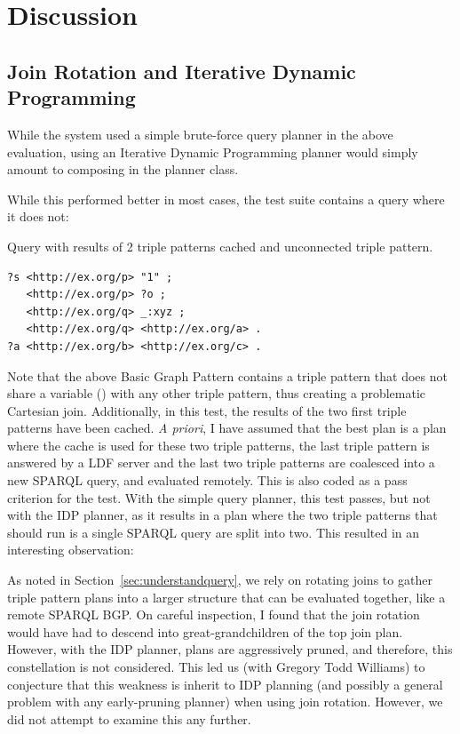 \section{Discussion}

\subsection{Join Rotation and Iterative Dynamic
  Programming}

While the system used a simple brute-force query planner in the above
evaluation, using an Iterative Dynamic Programming planner
\cite{Kossmann:2000:IDP:352958.352982} would simply amount to
composing  in the planner class.

While this performed better in most cases, the test suite contains a
query where it does not:
\begin{example}{Query with results of 2 triple patterns cached and
    unconnected triple pattern.}
\begin{verbatim}
?s <http://ex.org/p> "1" ;
   <http://ex.org/p> ?o ;
   <http://ex.org/q> _:xyz ;
   <http://ex.org/q> <http://ex.org/a> .
?a <http://ex.org/b> <http://ex.org/c> .
\end{verbatim}
\end{example}
Note that the above Basic Graph Pattern contains a triple pattern that
does not share a variable () with any other triple pattern,
thus creating a problematic Cartesian join. Additionally, in this
test, the results of the two first triple patterns have been
cached. \textit{A priori}, I have assumed that the best plan is a plan
where the cache is used for these two triple patterns, the last triple
pattern is answered by a LDF server and the last two
triple patterns are coalesced into a new SPARQL query, and evaluated
remotely. This is also coded as a pass criterion for the test. With
the simple query planner, this test passes, but not with the IDP
planner, as it results in a plan where the two triple patterns that
should run is a single SPARQL query are split into two. This resulted
in an interesting observation:

As noted in Section~\ref{sec:understandquery}, we rely on rotating joins
to gather triple pattern plans into a larger structure that can be
evaluated together, like a remote SPARQL BGP. On careful inspection, I
found that the join rotation would have had to descend into
great-grandchildren of the top join plan. However, with the IDP
planner, plans are aggressively pruned, and therefore, this
constellation is not considered. This led us (with Gregory Todd
Williams) to conjecture that this weakness is inherit to IDP planning
(and possibly a general problem with any early-pruning planner) 
when using join rotation. However, we did not attempt to examine this any
further.

